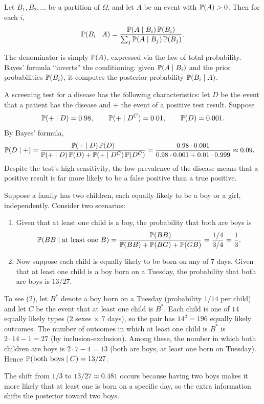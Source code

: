 \documentclass[a4paper]{article}
\begin{document}
\begin{thm}
  Let $B_1, B_2, \dotsc$ be a partition of $\Omega$, and let $A$ be an event with $\P(A) > 0$. Then for each $i$,
  \[
    \P(B_i \mid A) = \frac{\P(A \mid B_i)\,\P(B_i)}{\sum_j\P(A \mid B_j)\,\P(B_j)}.
  \]
\end{thm}

\begin{remark}
  The denominator is simply $\P(A)$, expressed via the law of total probability. Bayes' formula ``inverts'' the conditioning: given $\P(A \mid B_i)$ and the prior probabilities $\P(B_i)$, it computes the posterior probability $\P(B_i \mid A)$.
\end{remark}

\begin{eg}
  A screening test for a disease has the following characteristics: let $D$ be the event that a patient has the disease and $+$ the event of a positive test result. Suppose
  \[
    \P(+ \mid D) = 0.98, \qquad \P(+ \mid D^C) = 0.01, \qquad \P(D) = 0.001.
  \]
  By Bayes' formula,
  \begin{align*}
    \P(D\mid +) &= \frac{\P(+ \mid D)\,\P(D)}{\P(+\mid D)\,\P(D) + \P(+\mid D^C)\,\P(D^C)} = \frac{0.98\cdot 0.001}{0.98\cdot 0.001 + 0.01\cdot 0.999} \approx 0.09.
  \end{align*}
  Despite the test's high sensitivity, the low prevalence of the disease means that a positive result is far more likely to be a false positive than a true positive.
\end{eg}

\begin{eg}
  Suppose a family has two children, each equally likely to be a boy or a girl, independently. Consider two scenarios:
  \begin{enumerate}
    \item Given that at least one child is a boy, the probability that both are boys is
    \[
      \P(BB\mid \text{at least one }B) = \frac{\P(BB)}{\P(BB) + \P(BG) + \P(GB)} = \frac{1/4}{3/4} = \frac{1}{3}.
    \]
    \item Now suppose each child is equally likely to be born on any of 7 days. Given that at least one child is a boy born on a Tuesday, the probability that both are boys is $13/27$.
  \end{enumerate}
  To see (2), let $B^*$ denote a boy born on a Tuesday (probability $1/14$ per child) and let $C$ be the event that at least one child is $B^*$. Each child is one of $14$ equally likely types ($2$ sexes $\times$ $7$ days), so the pair has $14^2 = 196$ equally likely outcomes. The number of outcomes in which at least one child is $B^*$ is $2 \cdot 14 - 1 = 27$ (by inclusion-exclusion). Among these, the number in which both children are boys is $2 \cdot 7 - 1 = 13$ (both are boys, at least one born on Tuesday). Hence $\P(\text{both boys} \mid C) = 13/27$.

  The shift from $1/3$ to $13/27 \approx 0.481$ occurs because having two boys makes it more likely that at least one is born on a specific day, so the extra information shifts the posterior toward two boys.
\end{eg}
\end{document}

